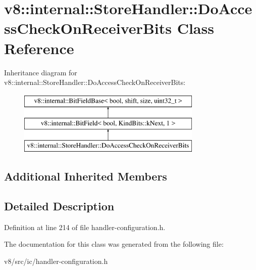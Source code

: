 \hypertarget{classv8_1_1internal_1_1StoreHandler_1_1DoAccessCheckOnReceiverBits}{}\section{v8\+:\+:internal\+:\+:Store\+Handler\+:\+:Do\+Access\+Check\+On\+Receiver\+Bits Class Reference}
\label{classv8_1_1internal_1_1StoreHandler_1_1DoAccessCheckOnReceiverBits}
Inheritance diagram for v8\+:\+:internal\+:\+:Store\+Handler\+:\+:Do\+Access\+Check\+On\+Receiver\+Bits\+:\begin{figure}[H]
\begin{center}
\leavevmode
\includegraphics[height=3.000000cm]{classv8_1_1internal_1_1StoreHandler_1_1DoAccessCheckOnReceiverBits}
\end{center}
\end{figure}
\subsection*{Additional Inherited Members}


\subsection{Detailed Description}


Definition at line 214 of file handler-\/configuration.\+h.



The documentation for this class was generated from the following file\+:\begin{DoxyCompactItemize}
\item 
v8/src/ic/handler-\/configuration.\+h\end{DoxyCompactItemize}
